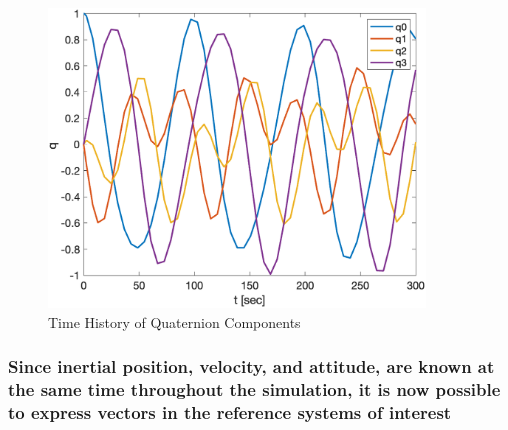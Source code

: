 \begin{figure} [H]
    \centering
    \captionsetup{justification = centering}
    \includegraphics[width = 10cm] {Images/time_history_quat.png}
    \caption{Time History of Quaternion Components}
    \label{fig:time_history_quaternion}
\end{figure}

\subsubsection{Since inertial position, velocity, and attitude, are known at the same time throughout the simulation, it is now possible to express vectors in the reference systems of interest}